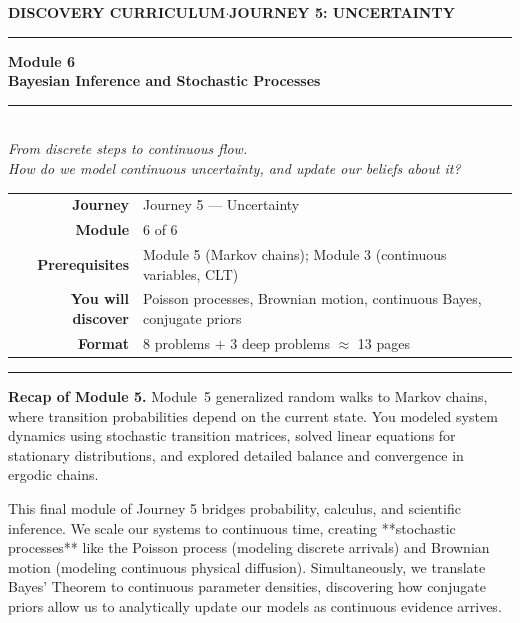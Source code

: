 \documentclass[12pt, a4paper]{article}
\newcounter{problem}
\begin{document}
\thispagestyle{empty}
\begin{center}
{\small\color{MidBlue}\textbf{DISCOVERY CURRICULUM}\quad$\cdot$\quad\textbf{JOURNEY 5: UNCERTAINTY}}
\vspace{0.6cm}

{\color{NavyBlue}\rule{\linewidth}{2pt}}\vspace{0.5cm}

{\Huge\bfseries\color{NavyBlue}Module 6}\\[0.3cm]
{\LARGE\bfseries\color{MidBlue}Bayesian Inference and Stochastic Processes}\\[0.4cm]
{\color{Gold}\rule{0.4\linewidth}{1.2pt}}\\[0.4cm]
{\large\itshape\color{DarkGrey}
From discrete steps to continuous flow.\\[0.15cm]
How do we model continuous uncertainty, and update our beliefs about it?}

\vspace{1cm}
\begin{tabular}{rl}
\color{DarkGrey}\textbf{Journey}           & Journey 5 --- Uncertainty \\[4pt]
\color{DarkGrey}\textbf{Module}            & 6 of 6 \\[4pt]
\color{DarkGrey}\textbf{Prerequisites}     & Module 5 (Markov chains); Module 3 (continuous variables, CLT) \\[4pt]
\color{DarkGrey}\textbf{You will discover} & Poisson processes, Brownian motion, continuous Bayes, conjugate priors \\[4pt]
\color{DarkGrey}\textbf{Format}            & 8 problems $+$ 3 deep problems $\approx$ 13 pages \\
\end{tabular}
\vspace{1cm}

{\color{NavyBlue}\rule{\linewidth}{2pt}}
\end{center}

\vspace{0.5cm}
\noindent\textbf{Recap of Module 5.}
Module~5 generalized random walks to Markov chains, where transition probabilities depend on the current state. You modeled system dynamics using stochastic transition matrices, solved linear equations for stationary distributions, and explored detailed balance and convergence in ergodic chains.

\medskip
This final module of Journey 5 bridges probability, calculus, and scientific inference. We scale our systems to continuous time, creating **stochastic processes** like the Poisson process (modeling discrete arrivals) and Brownian motion (modeling continuous physical diffusion). Simultaneously, we translate Bayes' Theorem to continuous parameter densities, discovering how conjugate priors allow us to analytically update our models as continuous evidence arrives.
\end{document}
